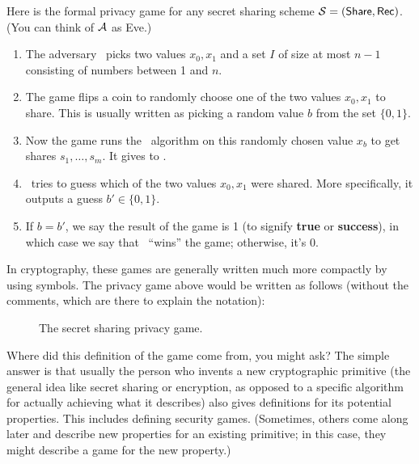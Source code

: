 Here is the formal privacy game for any secret sharing scheme $\mathcal{S} =
(\mathsf{Share},\allowbreak \mathsf{Rec})$. (You can think of $\mathcal{A}$ as Eve.)
\begin{enumerate}
    \item The adversary \A~picks two values $x_0, x_1$ and a set $I$ 
    of size at most $n-1$ consisting of numbers between 1 and $n$.
    \item The game flips a coin to randomly choose one of the two values 
    $x_0,x_1$ to share.
    This is usually written as picking a random value $b$ from the set 
    $\{0, 1\}$.
    \item Now the game runs the \share~algorithm on this randomly chosen 
    value $x_b$ to get shares $s_1, \ldots, s_m$. It gives 
    to \A.
    \item \A~tries to guess which of the two values $x_0, x_1$ were shared.
    More specifically, it outputs a guess $b' \in \{0, 1\}$. 
    \item If $b=b'$, we say the result of the game is 1 (to signify 
    \textbf{true} or \textbf{success}), in which case we say that \A~``wins''
    the game; otherwise, it's 0.
\end{enumerate}

In cryptography, these games are generally written much more compactly by 
using symbols. The privacy game above would be written as follows (without 
the comments, which are there to explain the notation):

\begin{figure}[h!]
\begin{center}\end{center}
\caption{The secret sharing privacy game.}
\label{fig:ss-priv}
\end{figure}

Where did this definition of the game come from, you might ask? The simple 
answer is that usually the person who invents a new cryptographic 
primitive (the general idea like secret sharing or 
encryption, as opposed to a specific algorithm for actually achieving 
what it describes) also gives definitions for its potential properties. 
This includes defining security games. (Sometimes, others come along 
later and describe new properties for an existing primitive; in this 
case, they might describe a game for the new property.) 

